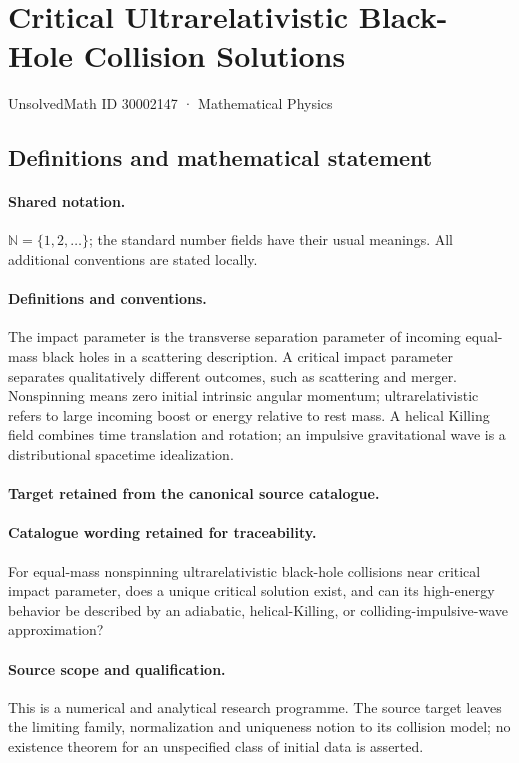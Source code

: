 \documentclass[11pt]{article}
\begin{document}
\setcounter{section}{30002146}
\section{Critical Ultrarelativistic Black-Hole Collision Solutions}\label{30002147}
{\small UnsolvedMath ID 30002147 · Mathematical Physics}
\subsection{Definitions and mathematical statement}

\paragraph{Shared notation.}$\mathbb N=\{1,2,\ldots\}$; the standard number fields have their usual meanings. All additional conventions are stated locally.


\paragraph{Definitions and conventions.}
The impact parameter is the transverse separation parameter of incoming equal-mass black holes in a scattering description. A critical impact parameter separates qualitatively different outcomes, such as scattering and merger. Nonspinning means zero initial intrinsic angular momentum; ultrarelativistic refers to large incoming boost or energy relative to rest mass. A helical Killing field combines time translation and rotation; an impulsive gravitational wave is a distributional spacetime idealization.

\paragraph{Target retained from the canonical source catalogue.}
\paragraph{Catalogue wording retained for traceability.}
For equal-mass nonspinning ultrarelativistic black-hole collisions near critical impact parameter, does a unique critical solution exist, and can its high-energy behavior be described by an adiabatic, helical-Killing, or colliding-impulsive-wave approximation?

\paragraph{Source scope and qualification.}
This is a numerical and analytical research programme. The source target leaves the limiting family, normalization and uniqueness notion to its collision model; no existence theorem for an unspecified class of initial data is asserted.
\end{document}
